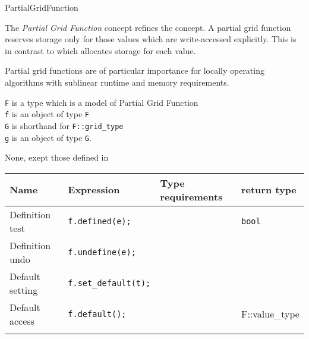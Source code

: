 \begin{Label}{PartialGridFunction}
\end{Label}


The  {\em Partial Grid Function\/} concept refines the 
 concept.
A partial grid function reserves storage only for those values which are
write-accessed explicitly.
This is in contrast to 
which allocates storage for each value.

Partial grid functions are of particular importance for locally operating 
algorithms with sublinear runtime and memory requirements.


{\tt F} is a type which is a model of  Partial Grid  Function 
\\
{\tt f} is an object of type  {\tt F}
\\
{\tt G} is shorthand for  {\tt F::grid\_type}
\\
{\tt g} is an object of type  {\tt G}.

\begin{ifhtml}
None, exept those defined in
\end{ifhtml}

\begin{tabular}{llll} 
  \T \hline
  \bf  Name  &\bf  Expression  &\bf  Type requirements  & \bf  return type  \\ 
  \hline
  Definition test  &
  {\tt f.defined(e);} &
  ~ &
  {\tt bool} 
  \\ 
  Definition undo &
  {\tt f.undefine(e);} &
  ~ &
  ~
  \\ 
  Default setting &
  {\tt f.set\_default(t);} &
  ~ &
  ~ 
  \\ 
  Default access &
  {\tt f.default();} &
  ~ &
  F::value\_type 
  \T\\ 
  \T\hline
  \T\\
\end{tabular}


